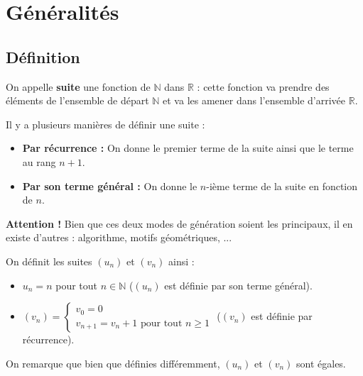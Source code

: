 






	\section{Généralités}

	\subsection{Définition}

	On appelle \textbf{suite} une fonction de $\mathbb{N}$ dans $\mathbb{R}$ : cette fonction va prendre des éléments de l'ensemble de départ $\mathbb{N}$ et va les amener dans l'ensemble d'arrivée $\mathbb{R}$.

	\begin{formula}[Définition]
		Il y a plusieurs manières de définir une suite :
		\begin{itemize}
			\item \textbf{Par récurrence :} On donne le premier terme de la suite ainsi que le terme au rang $n+1$.
			\item \textbf{Par son terme général :} On donne le $n$-ième terme de la suite en fonction de $n$.
		\end{itemize}
	\end{formula}

	\textbf{Attention !} Bien que ces deux modes de génération soient les principaux, il en existe d'autres : algorithme, motifs géométriques, ...

	\begin{tip}[Exemple]
		On définit les suites $(u_n)$ et $(v_n)$ ainsi :
		\begin{itemize}
			\item $u_n = n$ pour tout $n \in \mathbb{N}$ ($(u_n)$ est définie par son terme général).
			\item $(v_n) = \begin{cases} v_0 = 0 \\ v_{n+1} = v_n + 1 \text{ pour tout } n \geq 1 \end{cases}$ ($(v_n)$ est définie par récurrence).
		\end{itemize}
		On remarque que bien que définies différemment, $(u_n)$ et $(v_n)$ sont égales.
	\end{tip}

